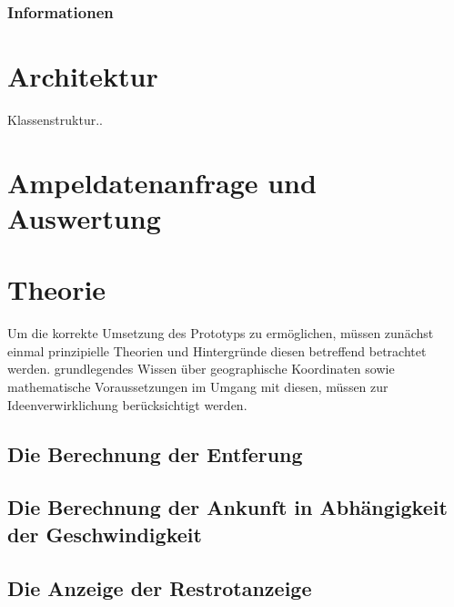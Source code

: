 \subsubsection{Informationen}
\section{Architektur}
Klassenstruktur..
\section{Ampeldatenanfrage und Auswertung}
\section{Theorie}
Um die korrekte Umsetzung des Prototyps zu ermöglichen, müssen zunächst einmal prinzipielle
Theorien und Hintergründe diesen betreffend betrachtet werden.
grundlegendes Wissen über geographische Koordinaten sowie mathematische Voraussetzungen im Umgang mit diesen, müssen zur Ideenverwirklichung berücksichtigt werden.
\subsection{Die Berechnung der Entferung}
\subsection{Die Berechnung der Ankunft in Abhängigkeit der Geschwindigkeit}
\subsection{Die Anzeige der Restrotanzeige}
